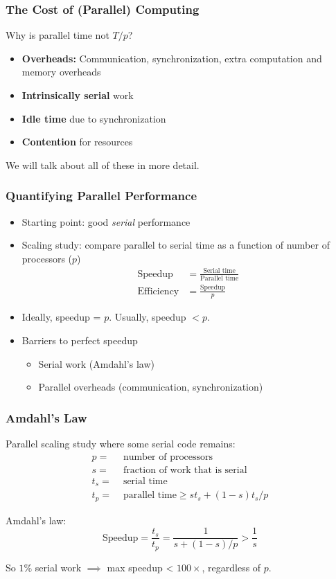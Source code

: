 \documentclass{beamer}
\begin{document}
\begin{frame}
  \frametitle{The Cost of (Parallel) Computing}

  Why is parallel time not $T/p$?
  \begin{itemize}
  \item {\bf Overheads:} Communication, synchronization, extra
    computation and memory overheads
  \item {\bf Intrinsically serial} work
  \item {\bf Idle time} due to synchronization
  \item {\bf Contention} for resources
  \end{itemize}
  We will talk about all of these in more detail.
  
\end{frame}


\begin{frame}
  \frametitle{Quantifying Parallel Performance}
  
  \begin{itemize}
  \item Starting point: good {\em serial} performance
  \item Scaling study: compare parallel to serial time as a function of number of processors ($p$)
    \begin{align*}
      \mbox{Speedup} &= \frac{\mbox{Serial time}}{\mbox{Parallel time}} \\[2mm]
      \mbox{Efficiency} &= \frac{\mbox{Speedup}}{p}
    \end{align*}
  \item
    Ideally, speedup = $p$.  
    Usually, speedup $ < p$.
  \item Barriers to perfect speedup
    \begin{itemize}
    \item Serial work (Amdahl's law)
    \item Parallel overheads (communication, synchronization)
    \end{itemize}
  \end{itemize}
\end{frame}


\begin{frame}
  \frametitle{Amdahl's Law}

  Parallel scaling study where some serial code remains:
  \begin{align*}
    p = & \mbox{ number of processors} \\
    s = & \mbox{ fraction of work that is serial} \\
    t_s = & \mbox{ serial time} \\
    t_p = & \mbox{ parallel time} \geq s t_s + (1-s) t_s / p
  \end{align*}

  \vspace{2mm}
  Amdahl's law:
  \[
    \mbox{Speedup} = 
      \frac{t_s}{t_p} = \frac{1}{s + (1-s) / p} > \frac{1}{s}
  \]

  \vspace{5mm}
  So $1\%$ serial work $\implies$ max speedup < $100 \times$,
  regardless of $p$.
\end{frame}
\end{document}
